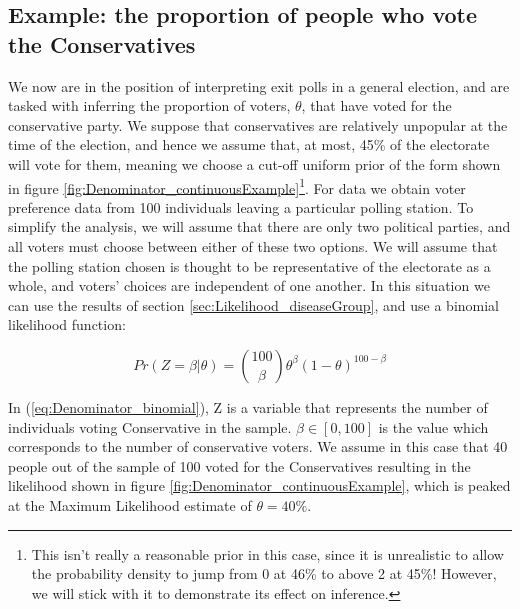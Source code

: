 \documentclass[11pt,fullpage]{book}
\begin{document}
\subsection{Example: the proportion of people who vote the  Conservatives}\label{sec:Denominator_continuousExample}
We now are in the position of interpreting exit polls in a general election, and are tasked with inferring the proportion of voters, $\theta$, that have voted for the conservative party. We suppose that conservatives are relatively unpopular at the time of the election, and hence we assume that, at most, 45\% of the electorate will vote for them, meaning we choose a cut-off uniform prior of the form shown in figure \ref{fig:Denominator_continuousExample}\footnote{This isn't really a reasonable prior in this case, since it is unrealistic to allow the probability density to jump from 0 at 46\% to above 2 at 45\%! However, we will stick with it to demonstrate its effect on inference.}. For data we obtain voter preference data from 100 individuals leaving a particular polling station. To simplify the analysis, we will assume that there are only two political parties, and all voters must choose between either of these two options. We will assume that the polling station chosen is thought to be representative of the electorate as a whole, and voters' choices are independent of one another. In this situation we can use the results of section \ref{sec:Likelihood_diseaseGroup}, and use a binomial likelihood function:

\begin{equation}\label{eq:Denominator_binomial}
Pr(Z=\beta|\theta) = {100 \choose \beta} \theta^\beta (1-\theta)^{100-\beta}
\end{equation}

In (\ref{eq:Denominator_binomial}), Z is a variable that represents the number of individuals voting Conservative in the sample. $\beta\in[0,100]$ is the value which corresponds to the number of conservative voters. We assume in this case that 40 people out of the sample of 100 voted for the Conservatives resulting in the likelihood shown in figure \ref{fig:Denominator_continuousExample}, which is peaked at the Maximum Likelihood estimate of $\theta=40\%$.
\end{document}
